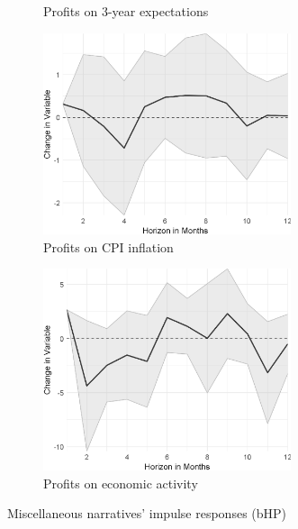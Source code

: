 \begin{figure}
\begin{subfigure}{00.24\textwidth}
		\caption{Profits on 3-year expectations}
	\end{subfigure}
	\begin{subfigure}{00.24\textwidth}
		\includegraphics[width=0.8\textwidth]{output/lp/baseline/bHP/profits/profitsoninflation_djn.eps}
		\caption{Profits on CPI inflation}
	\end{subfigure}
	\begin{subfigure}{00.24\textwidth}
		\includegraphics[width=0.8\textwidth]{output/lp/baseline/bHP/profits/profitsoneconac_djn.eps}
		\caption{Profits on economic activity}
	\end{subfigure}
	\caption{Miscellaneous narratives' impulse responses (bHP)}
	\label{fig:irf_4}
\end{figure}
